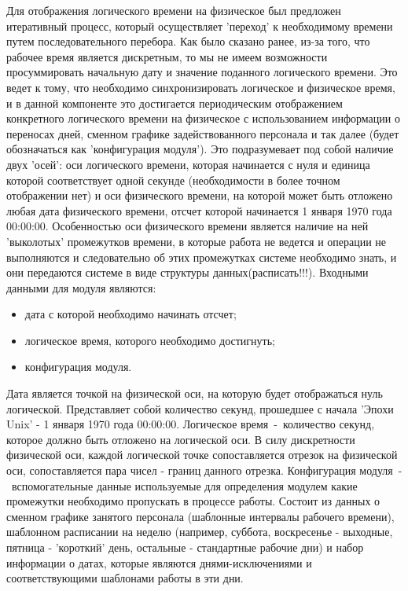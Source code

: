 Для отображения логического времени на физическое был предложен итеративный процесс, который осуществляет 'переход' к необходимому времени путем последовательного перебора.
\newline
Как было сказано ранее, из-за того, что рабочее время является дискретным, то мы не имеем возможности просуммировать начальную дату и значение поданного логического времени. Это ведет к тому, что необходимо синхронизировать логическое и физическое время, и в данной компоненте это достигается периодическим отображением конкретного логического времени на физическое с использованием информации о переносах дней, сменном графике задействованного персонала и так далее (будет обозначаться как 'конфигурация модуля').
\newline
Это подразумевает под собой наличие двух 'осей': оси логического времени, которая начинается с нуля и единица которой соответствует одной секунде (необходимости в более точном отображении нет) и оси физического времени, на которой может быть отложено любая дата физического времени, отсчет которой начинается 1 января 1970 года 00:00:00. Особенностью оси физического времени является наличие на ней 'выколотых' промежутков времени, в которые работа не ведется и операции не выполняются и следовательно об этих промежутках системе необходимо знать, и они передаются системе в виде структуры данных(расписать!!!).
\newline
Входными данными для модуля являются:
\begin{itemize}
	\item дата с которой необходимо начинать отсчет;
	\item логическое время, которого необходимо достигнуть;
	\item конфигурация модуля.
\end{itemize}
Дата является точкой на физической оси, на которую будет отображаться нуль логической. Представляет собой количество секунд, прошедшее с начала 'Эпохи Unix' - 1 января 1970 года 00:00:00.
Логическое время~-~количество секунд, которое должно быть отложено на логической оси. В силу дискретности физической оси, каждой логической точке сопоставляется отрезок на физической оси, сопоставляется пара чисел - границ данного отрезка.
Конфигурация модуля~-~вспомогательные данные используемые для определения модулем какие промежутки необходимо пропускать в процессе работы. Состоит из данных о сменном графике занятого персонала (шаблонные интервалы рабочего времени), шаблонном расписании на неделю (например, суббота, воскресенье - выходные, пятница - 'короткий' день, остальные - стандартные рабочие дни) и набор информации о датах, которые являются днями-исключениями и соответствующими шаблонами работы в эти дни.

